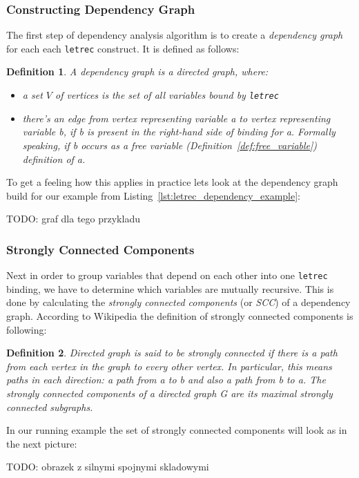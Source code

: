 \documentclass[a4paper]{report}
\newtheorem{definition}{Definition}[chapter]
\begin{document}
\subsubsection{Constructing Dependency Graph}
The first step of dependency analysis algorithm is to create a
\textit{dependency graph} for each each \texttt{letrec} construct. It is
defined as follows:
\begin{definition}
A dependency graph is a directed graph, where:
\begin{itemize}
  \item a set $V$ of vertices is the set of all variables bound by
    \texttt{letrec}
  \item there's an edge from vertex representing variable a to vertex
    representing variable b, if b is present in the right-hand side of
    binding for a. Formally speaking, if b occurs as a free variable
    (Definition~\ref{def:free_variable}) definition of a.
\end{itemize}
\end{definition}

To get a feeling how this applies in practice lets look at the dependency graph
build for our example from Listing~\ref{lst:letrec_dependency_example}:

TODO: graf dla tego przykladu

\subsubsection{Strongly Connected Components}
Next in order to group variables that depend on each other into one
\texttt{letrec} binding, we have to determine which variables are mutually
recursive. This is done by calculating the \textit{strongly connected
components} (or \textit{SCC}) of a dependency graph. According to Wikipedia the
definition of strongly connected components is following:

\begin{definition}
Directed graph is said to be strongly connected if there is a path from each
vertex in the graph to every other vertex. In particular, this means paths in
each direction: a path from a to b and also a path from b to a.
The strongly connected components of a directed graph G are its maximal
strongly connected subgraphs.
\end{definition}

In our running example the set of strongly connected components will look as
in the next picture:

TODO: obrazek z silnymi spojnymi skladowymi
\end{document}

